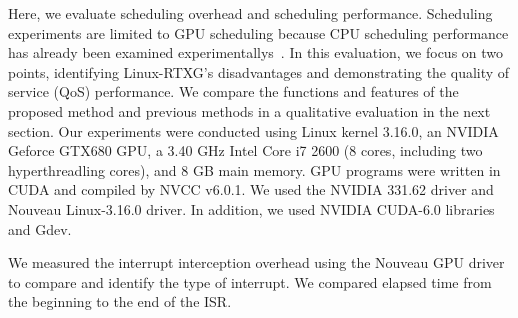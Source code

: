 \label{sec:evaluation}
Here, we evaluate scheduling overhead and scheduling performance.
Scheduling experiments are limited to GPU scheduling because CPU scheduling performance has already been examined experimentallys~\cite{kato2009loadable}.
In this evaluation, we focus on two points,
identifying Linux-RTXG's disadvantages and demonstrating the quality of service (QoS) performance.
We compare the functions and features of the proposed method and previous methods in a qualitative evaluation in the next section.
Our experiments were conducted using Linux kernel 3.16.0, an NVIDIA Geforce GTX680 GPU, a 3.40 GHz Intel Core i7 2600 (8 cores, including two hyperthreadling cores), and 8 GB main memory.
GPU programs were written in CUDA and compiled by NVCC v6.0.1.
We used the NVIDIA 331.62 driver and Nouveau Linux-3.16.0 driver.
In addition, we used NVIDIA CUDA-6.0 libraries and Gdev.

We measured the interrupt interception overhead using the Nouveau GPU driver to compare and identify the type of interrupt.
We compared elapsed time from the beginning to the end of the ISR.

